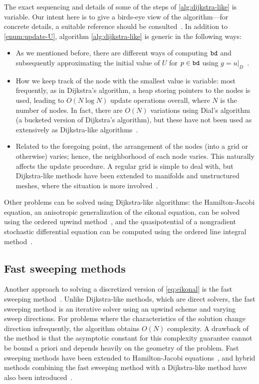 \documentclass[eikonal.tex]{subfiles}
\begin{document}
The exact sequencing and details of some of the steps of
\cref{alg:dijkstra-like} is variable. Our intent here is to give a
birds-eye view of the algorithm---for concrete details, a suitable
reference should be consulted~\cite{sethian1999level}. In addition to
\cref{enum:update-U}, algorithm \cref{alg:dijkstra-like} is generic in
the following ways:
\begin{itemize}
\item As we mentioned before, there are different ways of computing
  $\texttt{bd}$ and subsequently approximating the initial value of $U$
  for $p \in \texttt{bd}$ using
  $g = \left. u \right|_D$~\cite{chopp2001some}.
\item How we keep track of the node with the smallest value is
  variable: most frequently, as in Dijkstra's algorithm, a heap
  storing pointers to the nodes is used, leading to $O(N \log N)$
  update operations overall, where $N$ is the number of nodes. In
  fact, there are $O(N)$ variations using Dial's algorithm (a bucketed
  version of Dijkstra's algorithm), but these have not been used as
  extensively as Dijkstra-like
  algorithms~\cite{tsitsiklis1995efficient,kim2001calo}.
\item Related to the foregoing point, the arrangement of the nodes
  (into a grid or otherwise) varies; hence, the neighborhood of each
  node varies. This naturally affects the update procedure. A regular
  grid is simple to deal with, but Dijkstra-like methods have been
  extended to manifolds and unstructured meshes, where the situation
  is more
  involved~\cite{kimmel1998computing,sethian2000fast,bronstein2008numerical}.
\end{itemize}
Other problems can be solved using Dijkstra-like algorithms: the
Hamilton-Jacobi equation, an anisotropic generalization of the eikonal
equation, can be solved using the ordered upwind
method~\cite{sethian2003ordered}, and the quasipotential of a
nongradient stochastic differential equation can be computed using the
ordered line integral
method~\cite{dahiya2017ordered,dahiya2018ordered,yang2018computing}.

\subsection{Fast sweeping methods} Another approach to solving a
discretized version of \cref{eq:eikonal} is the fast sweeping
method~\cite{tsai2003fast,zhao2005fast}. Unlike Dijkstra-like methods,
which are direct solvers, the fast sweeping method is an iterative
solver using an upwind scheme and varying sweep directions. For
problems where the characteristics of the solution change direction
infrequently, the algorithm obtains $O(N)$ complexity. A drawback of
the method is that the asymptotic constant for this complexity
guarantee cannot be bound a priori and depends heavily on the geometry
of the problem. Fast sweeping methods have been extended to
Hamilton-Jacobi equations~\cite{kao2004lax,tsai2003fast}, and hybrid
methods combining the fast sweeping method with a Dijkstra-like method
have also been introduced~\cite{chacon2012fast,chacon2015parallel}.
\end{document}
